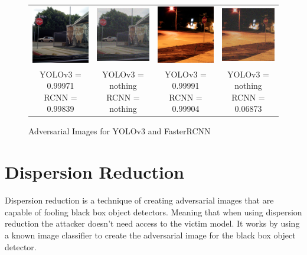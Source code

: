 \documentclass{article}
\begin{document}
\begin{figure}[h]
\begin{tabular}{c c@{\hskip 1cm} c c}
        \includegraphics[width=0.2\linewidth]{../test_images/stop3.png} &  \includegraphics[width=0.2\linewidth]{../test_images/ensemble_adversarials/stop3.png} & 
        \includegraphics[width=0.2\linewidth]{../test_images/stop4.png} &  \includegraphics[width=0.2\linewidth]{../test_images/ensemble_adversarials/stop4.png} \\

        \makecell[t]{YOLOv3 = 0.99971 \\ RCNN = 0.99839} & \makecell[t]{YOLOv3 = nothing \\ RCNN = nothing} & \makecell[t]{YOLOv3 = 0.99991 \\ RCNN = 0.99904} & \makecell[t]{YOLOv3 = nothing \\ RCNN = 0.06873} \\
    \end{tabular}
\caption{Adversarial Images for YOLOv3 and FasterRCNN}
\label{fig:yoloadversarial}
\end{figure}

\section{Dispersion Reduction}
Dispersion reduction \cite{Lu_2020_CVPR} is a technique of creating adversarial images that are capable of fooling black box object detectors. Meaning that when using dispersion reduction the attacker doesn't need access to the victim model. It works by using a known image classifier to create the adversarial image for the black box object detector.
\end{document}
